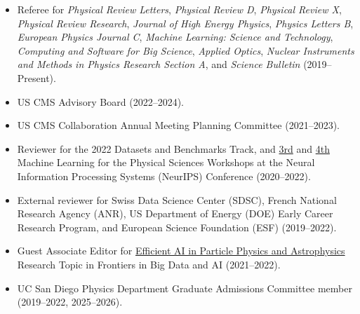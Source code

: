 \documentclass[11pt]{res}
\begin{document}
\begin{resume}
\begin{itemize}
    \item Referee for \emph{Physical Review Letters}, \emph{Physical Review D}, \emph{Physical Review X}, \emph{Physical Review Research}, \emph{Journal of High Energy Physics}, \emph{Physics Letters B}, \emph{European Physics Journal C}, \emph{Machine Learning: Science and Technology}, \emph{Computing and Software for Big Science}, \emph{Applied Optics}, \emph{Nuclear Instruments and Methods in Physics Research Section A}, and \emph{Science Bulletin} ({2019--Present}).
    \item US CMS Advisory Board (2022--2024).
    \item US CMS Collaboration Annual Meeting Planning Committee ({2021--2023}).
    \item Reviewer for the 2022 Datasets and Benchmarks Track, and \href{https://ml4physicalsciences.github.io/2020/}{3rd} and \href{https://ml4physicalsciences.github.io/2021/}{4th} Machine Learning for the Physical Sciences Workshops at the Neural Information Processing Systems (NeurIPS) Conference ({2020--2022}).
    \item External reviewer for Swiss Data Science Center (SDSC), French National Research Agency (ANR), US Department of Energy (DOE) Early Career Research Program, and European Science Foundation (ESF) ({2019--2022}).
    \item Guest Associate Editor for \href{https://www.frontiersin.org/research-topics/19095/efficient-ai-in-particle-physics-and-astrophysics}{Efficient AI in Particle Physics and Astrophysics} Research Topic in Frontiers in Big Data and AI ({2021--2022}).
    \item UC San Diego Physics Department Graduate Admissions Committee member ({2019--2022}, 2025--2026).
\end{itemize}
\end{resume}
\end{document}
